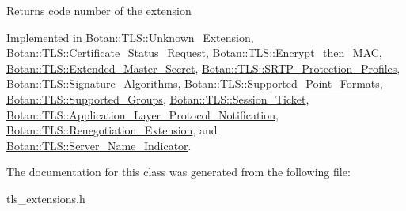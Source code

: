 \begin{DoxyReturn}{Returns}
code number of the extension 
\end{DoxyReturn}


Implemented in \hyperlink{class_botan_1_1_t_l_s_1_1_unknown___extension_a3662bce2ca66c928000baba33369623d}{Botan\+::\+T\+L\+S\+::\+Unknown\+\_\+\+Extension}, \hyperlink{class_botan_1_1_t_l_s_1_1_certificate___status___request_a30a98ada0f7b8cfaec9514794a22f54f}{Botan\+::\+T\+L\+S\+::\+Certificate\+\_\+\+Status\+\_\+\+Request}, \hyperlink{class_botan_1_1_t_l_s_1_1_encrypt__then___m_a_c_a56854b4e65b0cf1395b3b053df42f4f3}{Botan\+::\+T\+L\+S\+::\+Encrypt\+\_\+then\+\_\+\+M\+AC}, \hyperlink{class_botan_1_1_t_l_s_1_1_extended___master___secret_a4e0c181be783e0c301c286ffacd682ef}{Botan\+::\+T\+L\+S\+::\+Extended\+\_\+\+Master\+\_\+\+Secret}, \hyperlink{class_botan_1_1_t_l_s_1_1_s_r_t_p___protection___profiles_a7d0e938631996e86ceab9f94092f9119}{Botan\+::\+T\+L\+S\+::\+S\+R\+T\+P\+\_\+\+Protection\+\_\+\+Profiles}, \hyperlink{class_botan_1_1_t_l_s_1_1_signature___algorithms_a9a316f000ee5c6eb181e6109bbc40b55}{Botan\+::\+T\+L\+S\+::\+Signature\+\_\+\+Algorithms}, \hyperlink{class_botan_1_1_t_l_s_1_1_supported___point___formats_aeaf44021244451a57f6c257f13aa0a7d}{Botan\+::\+T\+L\+S\+::\+Supported\+\_\+\+Point\+\_\+\+Formats}, \hyperlink{class_botan_1_1_t_l_s_1_1_supported___groups_ab3126c91ffe1b598019892ed08117a67}{Botan\+::\+T\+L\+S\+::\+Supported\+\_\+\+Groups}, \hyperlink{class_botan_1_1_t_l_s_1_1_session___ticket_a0fb84fe33c30d28e0dee120ecc2fe228}{Botan\+::\+T\+L\+S\+::\+Session\+\_\+\+Ticket}, \hyperlink{class_botan_1_1_t_l_s_1_1_application___layer___protocol___notification_ab60d32531c669dd0d23fdddec69eee17}{Botan\+::\+T\+L\+S\+::\+Application\+\_\+\+Layer\+\_\+\+Protocol\+\_\+\+Notification}, \hyperlink{class_botan_1_1_t_l_s_1_1_renegotiation___extension_a68950eaadf339a1c739e044e9fdff665}{Botan\+::\+T\+L\+S\+::\+Renegotiation\+\_\+\+Extension}, and \hyperlink{class_botan_1_1_t_l_s_1_1_server___name___indicator_a3ecbe137658cbab2797a05441e65f42f}{Botan\+::\+T\+L\+S\+::\+Server\+\_\+\+Name\+\_\+\+Indicator}.



The documentation for this class was generated from the following file\+:\begin{DoxyCompactItemize}
\item 
tls\+\_\+extensions.\+h\end{DoxyCompactItemize}
